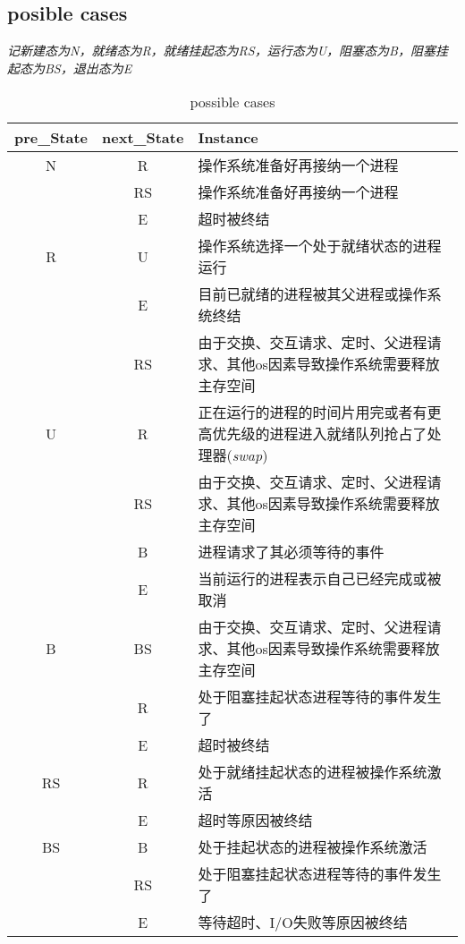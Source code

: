 \documentclass[UTF8]{ctexart}
\begin{document}
    \subsection*{posible cases}
    \emph{记新建态为N，就绪态为R，就绪挂起态为RS，运行态为U，阻塞态为B，阻塞挂起态为BS，退出态为E}
    \begin{table}[h]
    \centering
    \caption{possible cases}
    \large
    \begin{tabular}{ccp{10cm}}
        \hline
        pre\_State & next\_State & Instance\\
        \hline
        N & R & 操作系统准备好再接纳一个进程\\
         & RS & 操作系统准备好再接纳一个进程\\
        & E & 超时被终结\\
        \hline
        R & U & 操作系统选择一个处于就绪状态的进程运行\\
          & E & 目前已就绪的进程被其父进程或操作系统终结\\
          & RS & 由于交换、交互请求、定时、父进程请求、其他os因素导致操作系统需要释放主存空间\\
        \hline
        U & R & 正在运行的进程的时间片用完或者有更高优先级的进程进入就绪队列抢占了处理器(\emph{swap})\\
          & RS & 由于交换、交互请求、定时、父进程请求、其他os因素导致操作系统需要释放主存空间\\
          & B & 进程请求了其必须等待的事件\\
          & E & 当前运行的进程表示自己已经完成或被取消\\
        \hline
        B & BS & 由于交换、交互请求、定时、父进程请求、其他os因素导致操作系统需要释放主存空间\\
         & R & 处于阻塞挂起状态进程等待的事件发生了\\
         & E & 超时被终结\\
        \hline
        RS & R & 处于就绪挂起状态的进程被操作系统激活\\
        & E & 超时等原因被终结\\
        \hline
        BS & B & 处于挂起状态的进程被操作系统激活\\
          & RS & 处于阻塞挂起状态进程等待的事件发生了\\ 
          & E & 等待超时、I/O失败等原因被终结\\
        \hline
    \end{tabular}
    \end{table}
    \clearpage
\end{document}
